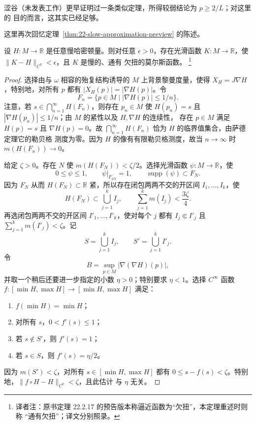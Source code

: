 涩谷（未发表工作）更早证明过一条类似定理，所得较弱结论为 $p\geq2/L$；对这里的
目的而言，这其实已经足够。

这里再次回忆定理~\ref{thm:22-slow-approximation-preview} 的陈述。

\begin{theorem}
\label{thm:22-slow-approximation}
设 $H:M\to\mathbb R$ 是任意慢哈密顿量。则对任意 $\epsilon>0$，存在光滑函数
$K:M\to\mathbb R$，使 $\lVert K-H\rVert_{C^0}<\epsilon$，且 $K$ 是慢的、通有
欠扭的莫尔斯函数。
\footnote{译者注：原书定理 22.2.17 的预告版本称逼近函数为“欠扭”，本定理重述时则称
“通有欠扭”；译文分别照录。}
\end{theorem}

\begin{proof}
选择由与 $\omega$ 相容的殆复结构诱导的 $M$ 上背景黎曼度量，使得
$X_H=J\nabla H$，特别地，对所有 $p$ 都有 $|X_H(p)|=|\nabla H(p)|$。令
\[
 F_n=\{p\in M\mid |\nabla H(p)|\leq1/n\}.
\]
注意，若 $s\in\bigcap_{n=1}^\infty H(F_n)$，则存在 $p_n\in M$ 使
$H(p_n)=s$ 且 $|\nabla H(p_n)|\leq1/n$；由 $M$ 的紧性以及 $H,\nabla H$ 的连续性，
存在 $p\in M$ 满足 $H(p)=s$ 且 $\nabla H(p)=0$。故
$\bigcap_{n=1}^\infty H(F_n)$ 恰为 $H$ 的临界值集合，由萨德定理它的勒贝格
测度为零。因为 $H$ 的像有有限勒贝格测度，故当 $n\to\infty$ 时
$m(H(F_n))\to0$。

给定 $\zeta>0$。存在 $N$ 使 $m(H(F_N))<\zeta/2$。选择光滑函数
$\psi:M\to\mathbb R$，使
\[
 0\leq\psi\leq1,\qquad \psi|_{F_{2N}}=1,
 \qquad\operatorname{supp}(\psi)\subset F_N.
\]
因为 $F_N$ 从而 $H(F_N)\subset\mathbb R$ 紧，所以存在闭包两两不交的开区间
$I_1,\ldots,I_k$，使
\[
 H(F_N)\subset\bigcup_{j=1}^k I_j,
 \qquad\sum_{j=1}^k m(I_j)<\frac{3\zeta}{4}.
\]
再选闭包两两不交的开区间 $I'_1,\ldots,I'_k$，使对每个 $j$ 都有
$I_j\Subset I'_j$ 且 $\sum_{j=1}^k m(I'_j)<\zeta$。记
\[
 S=\bigcup_{j=1}^k I_j,
 \qquad S'=\bigcup_{j=1}^k I'_j.
\]
令
\[
 B=\sup_{p\in M}|\nabla(\nabla H)(p)|,
\]
并取一个稍后还要进一步指定的小数 $\eta>0$；特别要求 $\eta<1$。选择
$C^\infty$ 函数
$f:[\min H,\max H]\to[\min H,\max H]$ 满足：
\begin{enumerate}
 \item $f(\min H)=\min H$；
 \item 对所有 $s$，$0<f'(s)\leq1$；
 \item 若 $s\notin S'$，则 $f'(s)=1$；
 \item 若 $s\in S$，则 $f'(s)=\eta/2$。
\end{enumerate}
因为 $m(S')<\zeta$，对所有 $s\in[\min H,\max H]$ 都有
$0\leq s-f(s)<\zeta$。特别地，$\lVert f\circ H-H\rVert_{C^0}<\zeta$，且此估计
与 $\eta$ 无关。


\end{proof}
